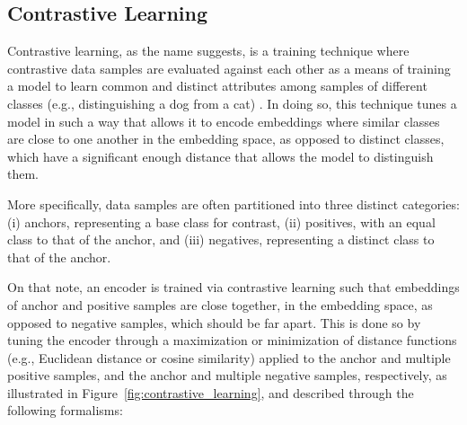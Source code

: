 \subsection{Contrastive Learning}
Contrastive learning, as the name suggests, is a training technique where contrastive data samples are evaluated against each other as a means of training a model to learn common and distinct attributes among samples of different classes (e.g., distinguishing a dog from a cat) \cite{contrastive_learning_multimodal_day}. In doing so, this technique tunes a model in such a way that allows it to encode embeddings where similar classes are close to one another in the embedding space, as opposed to distinct classes, which have a significant enough distance that allows the model to distinguish them.

More specifically, data samples are often partitioned into three distinct categories: (i) anchors, representing a base class for contrast, (ii) positives, with an equal class to that of the anchor, and (iii) negatives, representing a distinct class to that of the anchor.

On that note, an encoder is trained via contrastive learning such that embeddings of anchor and positive samples are close together, in the embedding space, as opposed to negative samples, which should be far apart. This is done so by tuning the encoder through a maximization or minimization of distance functions (e.g., Euclidean distance or cosine similarity) applied to the anchor and multiple positive samples, and the anchor and multiple negative samples, respectively, as illustrated in Figure~\ref{fig:contrastive_learning}, and described through the following formalisms:

